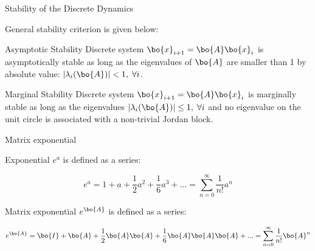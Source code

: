 \documentclass{beamer}
\begin{document}
\begin{frame}{Stability of the Discrete Dynamics}
\begin{flushleft}

General stability criterion is given below:

\bigskip

\begin{block}{Asymptotic Stability}
Discrete system $\bo{x}_{i+1} = \bo{A}\bo{x}_i$ is asymptotically stable as long as the eigenvalues of $\bo{A}$ are smaller than 1 by absolute value: $|\lambda_i(\bo{A})| < 1, \; \forall i$.
\end{block}

\begin{block}{Marginal Stability}
Discrete system $\bo{x}_{i+1} = \bo{A}\bo{x}_i$ is marginally stable as long as the eigenvalues $|\lambda_i(\bo{A})| \leq 1, \; \forall i$ \textcolor{mynormalgray}{and no eigenvalue on the unit circle is associated with a non-trivial Jordan block}.
\end{block}

\end{flushleft}
\end{frame}



\begin{frame}
	
	
\end{frame}





\begin{frame}{Matrix exponential}
	\begin{flushleft}
		
		Exponential $e^a$ is defined as a series:
		
		\begin{equation}
			e^a =1+a+\frac{1}{2} a^2
			+\frac{1}{6} a^3 + ... = \sum_{n=0}^{\infty} \frac{1}{n!} a^n
		\end{equation}
		
		Matrix exponential $e^\bo{A}$ is defined as a series:
		
		\begin{equation}
			e^\bo{A} = \bo{I}+\bo{A}+\frac{1}{2} \bo{A}\bo{A}
			+\frac{1}{6} \bo{A}\bo{A}\bo{A} + ... = \sum_{n=0}^{\infty} \frac{1}{n!} \bo{A}^n
		\end{equation}
		
		
	\end{flushleft}
\end{frame}
\end{document}
